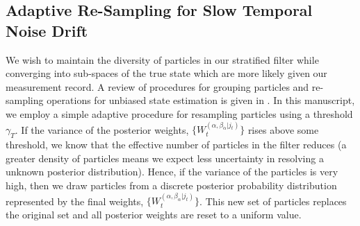 \subsection{Adaptive Re-Sampling for Slow Temporal Noise Drift}
We wish to maintain the diversity of particles in our stratified filter while converging into sub-spaces of the true state which are more likely given our measurement record. A review of procedures for grouping particles and re-sampling operations for unbiased state estimation is given in \cite{li2015resampling}. In this manuscript, we employ a simple adaptive procedure for resampling particles using a threshold $\gamma_{T}$. If the variance of the posterior weights, $\{W_t^{(\alpha, \beta_\alpha | j_t)}\}$ rises above some threshold, we know that the effective number of particles in the filter reduces (a greater density of particles means we expect less uncertainty in resolving a unknown posterior distribution). Hence, if the variance of the particles is very high, then we draw particles from a discrete posterior probability distribution represented by the final weights, $\{W_t^{(\alpha, \beta_\alpha | j_t)}\}$. This new set of particles replaces the original set  and all posterior weights are reset to a uniform value. 

